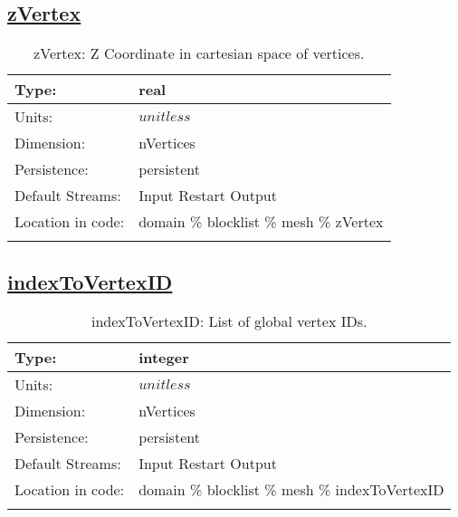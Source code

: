 \subsection[zVertex]{\hyperref[sec:var_tab_mesh]{zVertex}}
\label{subsec:var_sec_mesh_zVertex}
\begin{center}
\begin{longtable}{| p{2.0in} | p{4.0in} |}
        \hline 
        Type: & real \\
        \hline 
        Units: & $unitless$ \\
        \hline 
        Dimension: & nVertices \\
        \hline 
        Persistence: & persistent \\
        \hline 
		 Default Streams: & Input Restart Output  \\
        \hline 
		 Location in code: & domain \% blocklist \% mesh \% zVertex \\
		 \hline 
    \caption{zVertex: Z Coordinate in cartesian space of vertices.}
\end{longtable}
\end{center}
\subsection[indexToVertexID]{\hyperref[sec:var_tab_mesh]{indexToVertexID}}
\label{subsec:var_sec_mesh_indexToVertexID}
\begin{center}
\begin{longtable}{| p{2.0in} | p{4.0in} |}
        \hline 
        Type: & integer \\
        \hline 
        Units: & $unitless$ \\
        \hline 
        Dimension: & nVertices \\
        \hline 
        Persistence: & persistent \\
        \hline 
		 Default Streams: & Input Restart Output  \\
        \hline 
		 Location in code: & domain \% blocklist \% mesh \% indexToVertexID \\
		 \hline 
    \caption{indexToVertexID: List of global vertex IDs.}
\end{longtable}
\end{center}
